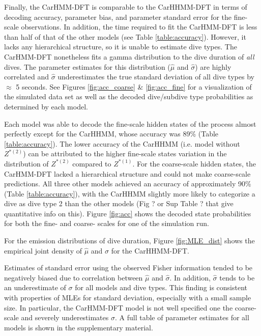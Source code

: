 Finally, the CarHMM-DFT is comparable to the CarHHMM-DFT in terms of decoding accuracy, parameter bias, and parameter standard error for the fine-scale observations. In addition, the time required to fit the CarHMM-DFT is less than half of that of the other models (see Table \ref{table:accuracy}). However, it lacks any hierarchical structure, so it is unable to estimate dive types. The CarHMM-DFT nonetheless fits a gamma distribution to the dive duration of \textit{all} dives. The parameter estimates for this distribution ($\hat \mu$ and $\hat \sigma$) are highly correlated and $\hat \sigma$ underestimates the true standard deviation of all dive types by $\approx$ 5 seconds. See Figures \ref{fig:acc_coarse} \& \ref{fig:acc_fine} for a visualization of the simulated data set as well as the decoded dive/subdive type probabilities as determined by each model.






\iffalse
Each model was able to decode the fine-scale hidden states of the process almost perfectly except for the CarHHMM, whose accuracy was 89\% (Table \ref{table:accuracy}). The lower accuracy of the CarHHMM (i.e. model without $Z^{*(2)}$)  can be attributed to the higher fine-scale states variation in the distribution of $Z^{*(2)}$ compared to $Z^{*(1)}$. For the coarse-scale hidden states, the CarHMM-DFT lacked a hierarchical structure and could not make coarse-scale predictions. All three other models achieved an accuracy of approximately 90\% (Table \ref{table:accuracy}), with the CarHHMM slightly more likely to categorize a dive as dive type 2 than the other models (Fig ? or Sup Table ? that give quantitative info on this). Figure \ref{fig:acc} shows the decoded state probabilities for both the fine- and coarse- scales for one of the simulation run.

For the emission distributions of dive duration, Figure \ref{fig:MLE_dist} shows the empirical joint density of $\hat \mu$ and $\hat \sigma$ for the CarHHMM-DFT.

Estimates of standard error using the observed Fisher information tended to be negatively biased due to correlation between $\hat \mu$ and $\hat \sigma$. In addition, $\hat \sigma$ tends to be an underestimate of $\sigma$ for all models and dive types. This finding is consistent with properties of MLEs for standard deviation, especially with a small sample size. In particular, the CarHMM-DFT model is not well specified one the coarse-scale and severely underestimates $\sigma$. %
A full table of parameter estimates for all models is shown in the supplementary material.


